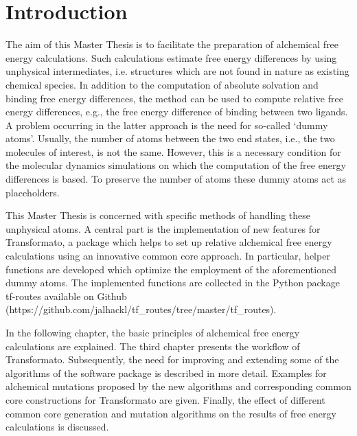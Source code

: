 \chapter{Introduction}

The aim of this Master Thesis is to facilitate the preparation of
alchemical free energy calculations. Such calculations
estimate free energy differences by using unphysical intermediates, i.e. structures
which are not found in nature as existing chemical species. In addition
to the computation of absolute solvation and binding free energy differences,
the method can be used to compute relative free energy differences, e.g.,
the free energy difference of binding between two ligands. A problem occurring
in the latter approach is the need for so-called \textquoteleft dummy
atoms\textquoteright . Usually, the number of atoms between the two
end states, i.e., the two molecules of interest, is not the same.
However, this is a necessary condition for the molecular dynamics
simulations on which the computation of the free energy differences
is based. To preserve the number of atoms these dummy atoms act as
placeholders\cite{Fleck.2021, Karwounopoulos.2022}.

This Master Thesis is concerned with specific methods of handling these unphysical
atoms. A central part is the implementation of new features
for Transformato, a package which helps to set up relative alchemical
free energy calculations using an innovative common core approach\cite{key-2, Wieder.2022}.
In particular, helper functions are developed which optimize the employment of
the aforementioned dummy atoms. 
The implemented functions are collected in the  Python package tf-routes available on Github (https://github.com/jalhackl/tf\_routes/tree/master/tf\_routes).

In the following chapter, the basic principles of alchemical free energy
calculations are explained. The third chapter presents the workflow
of Transformato. Subsequently, the need for improving and extending some of the algorithms of the software
package is described in more detail. Examples for alchemical mutations
proposed by the new algorithms and corresponding common core constructions
for Transformato are given. Finally, the effect of different common core generation and mutation
algorithms on the results of free energy calculations is discussed.